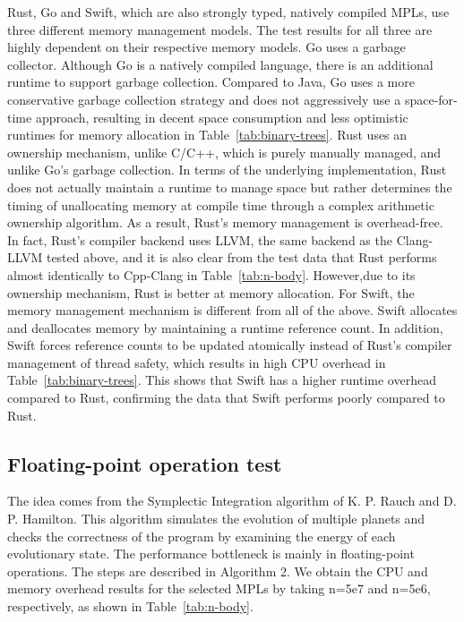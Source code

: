 Rust, Go and Swift, which are also strongly typed, natively compiled MPLs,
use three different memory management models.
The test results for all three are highly dependent on their
respective memory models.
Go uses a garbage collector.
Although Go is a natively compiled language, there is an additional runtime to support garbage collection.
Compared to Java, Go uses a more conservative garbage collection strategy and does
not aggressively use a space-for-time approach, resulting in decent space consumption
and less optimistic runtimes for memory allocation in Table~\ref{tab:binary-trees}.
Rust uses an ownership mechanism,
unlike C/C++, which is purely manually managed, and unlike Go's garbage collection.
In terms of the underlying implementation, Rust does not actually maintain a runtime
to manage space but rather determines the timing of unallocating memory at compile
time through a complex arithmetic ownership algorithm. As a result, Rust's memory
management is overhead-free. In fact, Rust's compiler backend uses LLVM, the same
backend as the Clang-LLVM tested above, and it is also clear from the test data that
Rust performs almost identically to Cpp-Clang in Table~\ref{tab:n-body}.
However,due to its ownership mechanism, Rust is better at memory allocation. For Swift,
the memory management mechanism is different from all of the above. Swift allocates
and deallocates memory by maintaining a runtime reference count. In addition,
Swift forces reference counts to be updated atomically instead of Rust's compiler
management of thread safety, which results in high CPU overhead in Table~\ref{tab:binary-trees}. This shows that
Swift has a higher runtime overhead compared to Rust, confirming the data that
Swift performs poorly compared to Rust.

\subsection{Floating-point operation test}

The idea comes from the Symplectic Integration algorithm of K. P. Rauch
and D. P. Hamilton.
This algorithm simulates the evolution of multiple planets and checks the correctness of the program by examining the energy of each evolutionary state. The performance bottleneck is mainly in floating-point operations.
The steps are described in Algorithm 2.
We obtain the CPU and memory overhead results
for the selected MPLs by taking n=5e7 and n=5e6, respectively,
as shown in Table~\ref{tab:n-body}.

